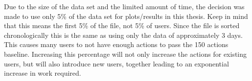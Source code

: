 \begin{table}[htbp]
	\centering
	\caption{The data set structure}\label{tab:data}
\end{table}

Due to the size of the data set and the limited amount of time, the decision was made to use only 5\% of the data set for plots/results in this thesis. Keep in mind that this means the first 5\% of the file, not 5\% of users. Since the file is sorted chronologically this is the same as using only the data of approximately 3 days. This causes many users to not have enough actions to pass the 150 actions baseline. Increasing this percentage will not only increase the actions for existing users, but will also introduce new users, together leading to an exponential increase in work required.

